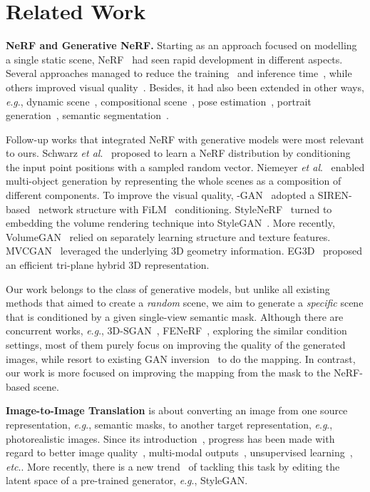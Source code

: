 \documentclass[runningheads]{llncs}
\newcommand{\etal}{\textit{et al}.}
\newcommand{\eg}{\textit{e}.\textit{g}.}
\newcommand{\etc}{\textit{etc}.}
\begin{document}
\section{Related Work}

\textbf{NeRF and Generative NeRF.}
Starting as an approach focused on modelling a single static scene, NeRF~\cite{mildenhall2020nerf} had seen rapid development in different aspects. Several approaches managed to reduce the training~\cite{sun2021direct} and inference time~\cite{liu2020neural,lombardi2021mixture}, while others improved visual quality~\cite{barron2021mip}. Besides, it had also been extended in other ways, \eg, dynamic scene~\cite{pumarola2021d}, compositional scene~\cite{wu2022objectsdf}, pose estimation~\cite{yen2021inerf}, portrait generation~\cite{liu2022semantic}, semantic segmentation~\cite{zhi2021place}. 

Follow-up works that integrated NeRF with generative models were most relevant to ours. Schwarz \etal~\cite{schwarz2020graf} proposed to learn a NeRF distribution by conditioning the input point positions with a sampled random vector.
Niemeyer \etal~\cite{niemeyer2021giraffe} enabled multi-object generation by representing the whole scenes as a composition of different components. To improve the visual quality, -GAN~\cite{chan2021pi} adopted a SIREN-based~\cite{sitzmann2020implicit} network structure with FiLM~\cite{perez2018film} conditioning. StyleNeRF~\cite{gu2021stylenerf} turned to embedding the volume rendering technique into StyleGAN~\cite{karras2020analyzing}. 
More recently, VolumeGAN~\cite{xu20213d} relied on separately learning structure and texture features. MVCGAN~\cite{zhang2022multi} leveraged the underlying 3D geometry information. EG3D~\cite{chan2021efficient} proposed an efficient tri-plane hybrid 3D representation.

Our work belongs to the class of generative models, but unlike all existing methods that aimed to create a \emph{random} scene, we aim to generate a \emph{specific} scene that is conditioned by a given single-view semantic mask. Although there are concurrent works, \eg, 3D-SGAN~\cite{zhang20213d}, FENeRF~\cite{sun2022fenerf}, exploring the similar condition settings, most of them purely focus on improving the quality of the generated images, while resort to existing GAN inversion~\cite{karras2020analyzing} to do the mapping. In contrast, our work is more focused on improving the mapping from the mask to the NeRF-based scene.


\noindent\textbf{Image-to-Image Translation} is about converting an image from one source representation, \eg, semantic masks, to another target representation, \eg, photorealistic images. Since its introduction~\cite{isola2017image}, progress has been made with regard to better image quality~\cite{wang2018high,chen2021edge}, multi-modal outputs~\cite{zhu2017toward,zheng2019pluralistic,choi2020stargan}, unsupervised learning~\cite{zhu2017unpaired,lira2020ganhopper}, \etc.  More recently,
there is a new trend~\cite{richardson2021encoding,shi2022semanticstylegan,xu2022transeditor} of tackling this task by editing the latent space of a pre-trained generator, \eg, StyleGAN.
\end{document}
